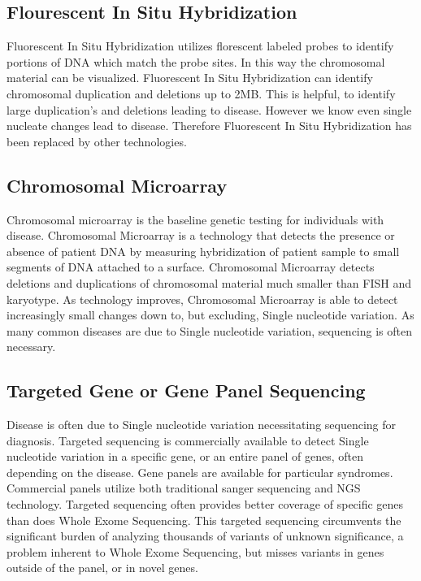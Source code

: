 \documentclass[sigconf]{acmart}
\begin{document}
\subsection{Flourescent In Situ Hybridization}
Fluorescent In Situ Hybridization utilizes florescent labeled probes to identify portions of DNA which match the probe sites. In this way the chromosomal material can be visualized.   Fluorescent In Situ Hybridization can identify chromosomal duplication and deletions up to 2MB.  This is helpful, to identify large duplication's and deletions leading to disease.  However we know even single nucleate changes lead to disease. Therefore Fluorescent In Situ Hybridization has been replaced by other technologies.      

\subsection{Chromosomal Microarray}
Chromosomal microarray is the baseline genetic testing for individuals with disease. Chromosomal Microarray is a technology that detects the presence or absence of patient DNA by measuring hybridization of patient sample to small segments of DNA attached to a surface.  Chromosomal Microarray detects deletions and duplications of chromosomal material much smaller than FISH and karyotype.  As technology improves, Chromosomal Microarray is able to detect increasingly small changes down to, but excluding, Single nucleotide variation.  As many common diseases are due to Single nucleotide variation, sequencing is often necessary.   

\subsection{Targeted Gene or Gene Panel Sequencing}
Disease is often due to Single nucleotide variation necessitating sequencing for diagnosis.  Targeted sequencing is commercially available to detect Single nucleotide variation in a specific gene, or an entire panel of  genes, often depending on the disease.  Gene panels are available for particular syndromes. Commercial panels utilize both traditional sanger sequencing and NGS technology.  Targeted sequencing often provides better coverage of specific genes than does Whole Exome Sequencing. This targeted sequencing circumvents the significant burden of analyzing thousands of variants of unknown significance, a problem inherent to Whole Exome Sequencing, but misses variants in genes outside of the panel, or in novel genes.
\end{document}
